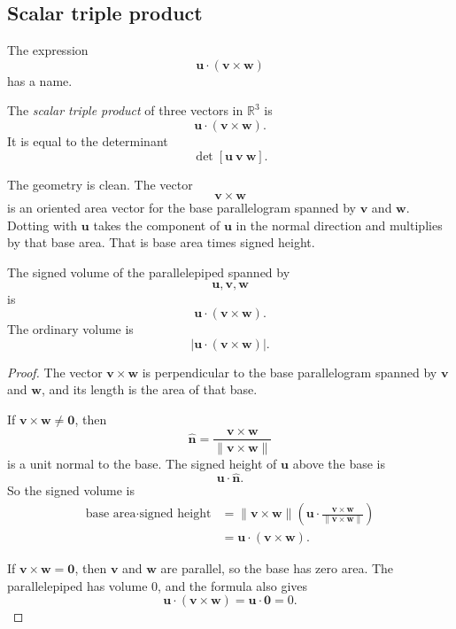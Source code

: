 \subsection{Scalar triple product}

The expression
\[
    \mathbf u\cdot(\mathbf v\times\mathbf w)
\]
has a name.

\begin{definition}
The \emph{scalar triple product} of three vectors in \(\mathbb R^3\) is
\[
\boxed{
    \mathbf u\cdot(\mathbf v\times\mathbf w).
}
\]
It is equal to the determinant
\[
    \det[\mathbf u\ \mathbf v\ \mathbf w].
\]
\end{definition}

The geometry is clean.  The vector
\[
    \mathbf v\times\mathbf w
\]
is an oriented area vector for the base parallelogram spanned by \(\mathbf v\) and
\(\mathbf w\).  Dotting with \(\mathbf u\) takes the component of \(\mathbf u\) in the
normal direction and multiplies by that base area.  That is base area times signed
height.

\begin{theorem}
The signed volume of the parallelepiped spanned by
\[
    \mathbf u,\mathbf v,\mathbf w
\]
is
\[
\boxed{
    \mathbf u\cdot(\mathbf v\times\mathbf w).
}
\]
The ordinary volume is
\[
\boxed{
    \left|\mathbf u\cdot(\mathbf v\times\mathbf w)\right|.
}
\]
\end{theorem}

\begin{proof}
The vector \(\mathbf v\times\mathbf w\) is perpendicular to the base parallelogram
spanned by \(\mathbf v\) and \(\mathbf w\), and its length is the area of that base.

If \(\mathbf v\times\mathbf w\neq\mathbf 0\), then
\[
    \widehat{\mathbf n}
    =
    \frac{\mathbf v\times\mathbf w}{\|\mathbf v\times\mathbf w\|}
\]
is a unit normal to the base.  The signed height of \(\mathbf u\) above the base is
\[
    \mathbf u\cdot\widehat{\mathbf n}.
\]
So the signed volume is
\[
\begin{aligned}
\text{base area}\cdot\text{signed height}
&=
\|\mathbf v\times\mathbf w\|
\left(
\mathbf u\cdot
\frac{\mathbf v\times\mathbf w}{\|\mathbf v\times\mathbf w\|}
\right)\\
&=
\mathbf u\cdot(\mathbf v\times\mathbf w).
\end{aligned}
\]

If \(\mathbf v\times\mathbf w=\mathbf 0\), then \(\mathbf v\) and \(\mathbf w\) are
parallel, so the base has zero area.  The parallelepiped has volume \(0\), and the
formula also gives
\[
    \mathbf u\cdot(\mathbf v\times\mathbf w)
    =
    \mathbf u\cdot\mathbf 0
    =
    0.
\]
\end{proof}

